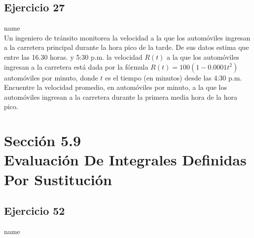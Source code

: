 \documentclass[12pt]{article}
\begin{document}
\subsection{Ejercicio 27} name \\

Un ingeniero de tránsito monitorea la velocidad a la que los automóviles ingresan a la carretera principal durante la hora pico de la tarde. De sus datos estima que entre las 16.30 horas. y 5:30 p.m. la velocidad $R(t)$ a la que los automóviles ingresan a la carretera está dada por la fórmula $R(t) = 100(1 − 0.0001t^2)$ automóviles por minuto, donde $t$ es el tiempo (en minutos) desde las 4:30 p.m. Encuentre la velocidad promedio, en automóviles por minuto, a la que los automóviles ingresan a la carretera durante la primera media hora de la hora pico.

\section{Sección 5.9 \\ Evaluación De Integrales Definidas Por Sustitución}
\subsection{Ejercicio 52} name \\
\end{document}
